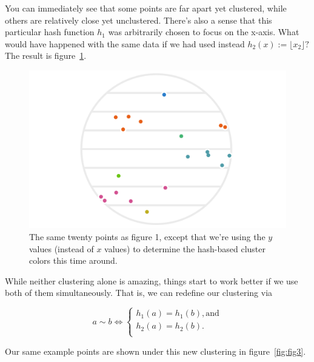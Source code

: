\documentclass[20pt,]{extarticle}
\newcommand{\smallscrneg}{}
\begin{document}
You can immediately see that some points are far apart yet clustered,
while others are relatively close yet unclustered. There's also a sense
that this particular hash function \(h_1\) was arbitrarily chosen to
focus on the x-axis. What would have happened with the same data if we
had used instead \(h_2(x) := \lfloor x_2 \rfloor?\) The result is
figure~\ref{fig:fig2}.

\begin{figure}
\centering
\includegraphics{images/lsh_image2.png}
\caption{The same twenty points as figure 1, except that we're using the
\(y\) values (instead of \(x\) values) to determine the hash-based
cluster colors this time around.}\label{fig:fig2}
\end{figure}

While neither clustering alone is amazing, things start to work better
if we use both of them simultaneously. That is, we can redefine our
clustering via

\begin{equation} a \sim b \iff
\begin{cases}
h_1(a) = h_1(b), \text{and} \\
h_2(a) = h_2(b). \\
\end{cases} \smallscrneg
\label{eq:eq1}\end{equation}

Our same example points are shown under this new clustering in
figure~\ref{fig:fig3}.
\end{document}

